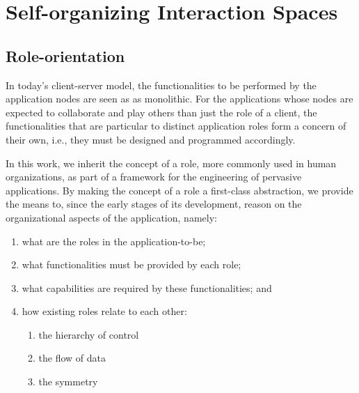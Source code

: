 


\section{Self-organizing Interaction Spaces}\label{sec:edge_spaces}

\subsection{Role-orientation}


In today's client-server model, the functionalities to be performed by the application nodes are seen as as monolithic. For the applications whose nodes are expected to collaborate and play others than just the role of a client, the functionalities that are particular to distinct application roles form a concern of their own, i.e., they must be designed and programmed accordingly. 

In this work, we inherit the concept of a role, more commonly used in human organizations, as part of a framework for the engineering of pervasive applications. By making the concept of a role a first-class abstraction, we provide the means to, since the early stages of its development, reason on the organizational aspects of the application, namely:

\begin{enumerate}[label=\roman*]
	
	\item what are the roles in the application-to-be;
	
	\item what functionalities must be provided by each role;
	
	\item what capabilities are required by these functionalities; and
	
	
	\item how existing roles relate to each other: 
	
	\begin{enumerate}[label=-]
		
		\item the hierarchy of control%
		
		\item the flow of data%
	
		\item the symmetry%
		
	\end{enumerate}	
	
\end{enumerate}

